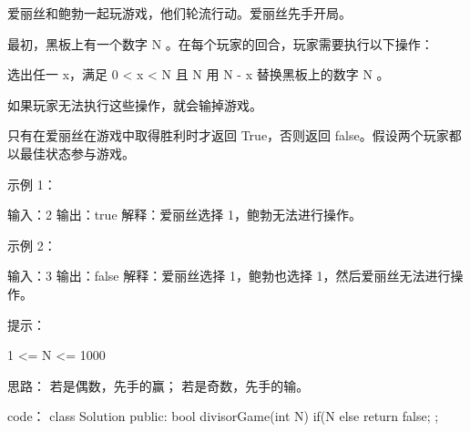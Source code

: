 爱丽丝和鲍勃一起玩游戏，他们轮流行动。爱丽丝先手开局。

最初，黑板上有一个数字 N 。在每个玩家的回合，玩家需要执行以下操作：

    选出任一 x，满足 0 < x < N 且 N %
    用 N - x 替换黑板上的数字 N 。

如果玩家无法执行这些操作，就会输掉游戏。

只有在爱丽丝在游戏中取得胜利时才返回 True，否则返回 false。假设两个玩家都以最佳状态参与游戏。

 

示例 1：

输入：2
输出：true
解释：爱丽丝选择 1，鲍勃无法进行操作。

示例 2：

输入：3
输出：false
解释：爱丽丝选择 1，鲍勃也选择 1，然后爱丽丝无法进行操作。

 

提示：

    1 <= N <= 1000




















思路：
若是偶数，先手的赢；
若是奇数，先手的输。






















code：
class Solution {
public:
    bool divisorGame(int N) {
        if(N %
        else return false;
    }
};